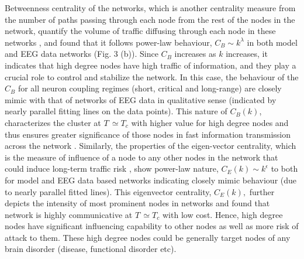 \documentclass[preprintnumbers,amsmath,amssymb,onecolumn]{revtex4}
\begin{document}
{\noindent}Betweenness centrality of the networks, which is another centrality measure from the number of paths passing through each node from the rest of the nodes in the network, quantify the volume of traffic diffusing through each node in these networks \citep{Freeman1978,borgatti2005}, and found that it follows power-law behaviour, $C_B\sim k^\lambda$ in both model and EEG data networks (Fig. 3 (b)). Since $C_B$ increases as $k$ increases, it indicates that high degree nodes have high traffic of information, and they play a crucial role to control and stabilize the network. In this case, the behaviour of the $C_B$ for all neuron coupling regimes (short, critical and long-range) are closely mimic with that of networks of EEG data in qualitative sense (indicated by nearly parallel fitting lines on the data points). This nature of $C_{B}(k)$, characterizes the cluster at $T\,\simeq$$T_{c}$ with higher value for high degree nodes and thus ensures greater significance of those nodes in fast information transmission across the network \citep{Bullmore2009}. Similarly, the properties of the eigen-vector centrality, which is the measure of influence of a node to any other nodes in the network that could induce long-term traffic risk \citep{bonacich1972}, show power-law nature, $C_E(k)\sim k^\epsilon$ to both for model and EEG data based networks indicating closely mimic behaviour (due to nearly parallel fitted lines). This eigenvector centrality, $C_{E}(k),$ further depicts the intensity of most prominent nodes in networks and found that network is highly communicative at $T\,\simeq$$T_{c}$ with low cost. Hence, high degree nodes have significant influencing capability to other nodes as well as more risk of attack to them. These high degree nodes could be generally target nodes of any brain disorder (disease, functional disorder etc).\\
\end{document}
